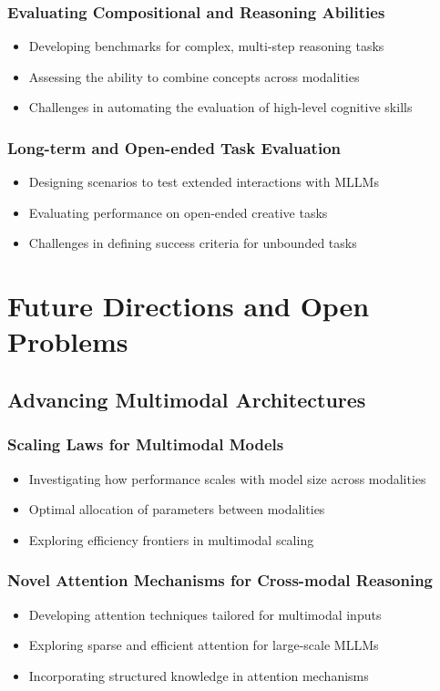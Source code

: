 \subsubsection{Evaluating Compositional and Reasoning Abilities}
\begin{itemize}
    \item Developing benchmarks for complex, multi-step reasoning tasks
    \item Assessing the ability to combine concepts across modalities
    \item Challenges in automating the evaluation of high-level cognitive skills
\end{itemize}

\subsubsection{Long-term and Open-ended Task Evaluation}
\begin{itemize}
    \item Designing scenarios to test extended interactions with MLLMs
    \item Evaluating performance on open-ended creative tasks
    \item Challenges in defining success criteria for unbounded tasks
\end{itemize}

\section{Future Directions and Open Problems}

\subsection{Advancing Multimodal Architectures}
\subsubsection{Scaling Laws for Multimodal Models}
\begin{itemize}
    \item Investigating how performance scales with model size across modalities
    \item Optimal allocation of parameters between modalities
    \item Exploring efficiency frontiers in multimodal scaling
\end{itemize}

\subsubsection{Novel Attention Mechanisms for Cross-modal Reasoning}
\begin{itemize}
    \item Developing attention techniques tailored for multimodal inputs
    \item Exploring sparse and efficient attention for large-scale MLLMs
    \item Incorporating structured knowledge in attention mechanisms
\end{itemize}

